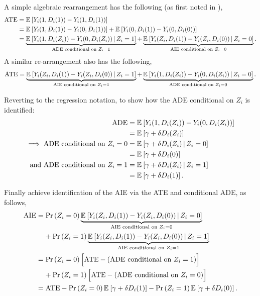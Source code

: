 A simple algebraic rearrangement has the following (as first noted in \citealt[Section~3.1]{imai2010identification}),
\begin{align*}
    \text{ATE} &= \mathbb{E}_{} \left[ Y_i(1, D_i(1)) - Y_i(1, D_i(1)) \right] \\
    &= \mathbb{E}_{} \left[  Y_i(1, D_i(1)) - Y_i(0, D_i(1)) \right]
    +  \mathbb{E}_{} \left[  Y_i(0, D_i(1)) - Y_i(0, D_i(0)) \right] \\
    &= \underbrace{\mathbb{E}_{} \left[  Y_i(1, D_i(Z_i)) - Y_i(0, D_i(Z_i)) \, \middle\vert \,  Z_i = 1 \right]}_{
        \text{ADE conditional on } Z_i = 1}
    +  \underbrace{\mathbb{E}_{} \left[  Y_i(Z_i, D_i(1)) - Y_i(Z_i, D_i(0)) \, \middle\vert \,  Z_i = 0 \right]}_{
        \text{AIE conditional on } Z_i = 0}.
\end{align*}
A similar re-arrangement also has the following,
\[ \text{ATE} 
    = \underbrace{\mathbb{E}_{} \left[  Y_i(Z_i, D_i(1)) - Y_i(Z_i, D_i(0)) \, \middle\vert \,  Z_i = 1 \right]}_{
        \text{AIE conditional on } Z_i = 1}
    + \underbrace{\mathbb{E}_{} \left[  Y_i(1, D_i(Z_i)) - Y_i(0, D_i(Z_i)) \, \middle\vert \,  Z_i = 0 \right]}_{
        \text{ADE conditional on } Z_i = 0}. \]

Reverting to the regression notation, to show how the ADE conditional on $Z_i$ is identified:
\begin{align*}
    \text{ADE} &= \mathbb{E}_{} \left[  Y_i(1, D_i(Z_i)) - Y_i(0, D_i(Z_i)) \right] \\
        &= \mathbb{E}_{} \left[  \gamma + \delta D_i(Z_i)  \right] \\
    \implies \text{ADE conditional on } Z_i = 0
        &= \mathbb{E}_{} \left[  \gamma + \delta D_i(Z_i)  \, \middle\vert \, Z_i = 0 \right] \\
        &= \mathbb{E}_{} \left[  \gamma + \delta D_i(0)  \right] \\
    \text{and ADE conditional on } Z_i = 1
        &= \mathbb{E}_{} \left[  \gamma + \delta D_i(Z_i)  \, \middle\vert \, Z_i = 1 \right] \\
        &= \mathbb{E}_{} \left[  \gamma + \delta D_i(1)  \right].
\end{align*}

Finally achieve identification of the AIE via the ATE and conditional ADE, as follows,
\begin{align*}
    \text{AIE}
    &= \Pr\left( Z_i = 0 \right)
    \underbrace{\mathbb{E}_{} \left[  Y_i(Z_i, D_i(1)) - Y_i(Z_i, D_i(0)) \, \middle\vert \,  Z_i = 0 \right]}_{
        \text{AIE conditional on } Z_i = 0} \\
    &\;\;\;\;+ \Pr\left( Z_i = 1 \right)
    \underbrace{\mathbb{E}_{} \left[  Y_i(Z_i, D_i(1)) - Y_i(Z_i, D_i(0)) \, \middle\vert \,  Z_i = 1 \right]}_{
        \text{AIE conditional on } Z_i = 1} \\
    &= \Pr\left( Z_i = 0 \right) \Big[
        \text{ATE} - (\text{ADE conditional on } Z_i = 1) \Big] \\
    &\;\;\;\;+ \Pr\left( Z_i = 1 \right) \Big[
        \text{ATE} - (\text{ADE conditional on } Z_i = 0) \Big] \\
    &= \text{ATE} - \Pr\left( Z_i = 0 \right) \mathbb{E}_{} \left[  \gamma + \delta D_i(1)  \right]
        - \Pr\left( Z_i = 1 \right) \mathbb{E}_{} \left[  \gamma + \delta D_i(0)  \right].
\end{align*}

